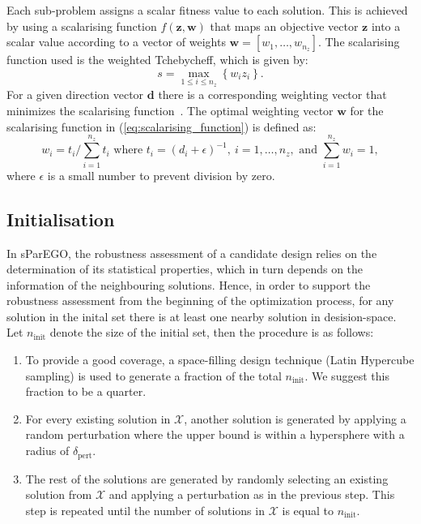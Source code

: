 \documentclass{llncs}
\newcommand{\vz}{\mathbf{z}} %
\newcommand{\vw}{\mathbf{w}} %
\newcommand{\vd}{\mathbf{d}} %
\newcommand{\XSet}{\mathcal{X}} %
\begin{document}
Each sub-problem assigns a scalar fitness value to each solution. This is achieved by using a scalarising function $f(\vz,\vw)$ that maps an objective vector $\vz$ into a scalar value according to a vector of weights $\vw=[w_1,\ldots,w_{n_z}]$. The scalarising function used is the weighted Tchebycheff, which is given by:
\begin{equation}
 s = \max\limits_{1\leq i \leq n_z} \left\{ w_i z_i \right\}.
 \label{eq:scalarising_function}
\end{equation}
For a given direction vector $\vd$ there is a corresponding weighting vector that minimizes the scalarising function~\cite{bib:generational_distance}. The optimal weighting vector $\vw$ for the scalarising function in (\ref{eq:scalarising_function}) is defined as:
\begin{equation}
w_i=t_i \Big/ \sum_{i=1}^{n_z} t_i \text{ where } t_i = (d_i+\epsilon)^{-1}, ~i=1,\ldots,n_z, \text{ and } \sum_{i=1}^{n_z} w_i=1,
\end{equation}
where $\epsilon$ is a small number to prevent division by zero.

\subsection{Initialisation}\label{subsec:initialisation}

In sParEGO, the robustness assessment of a candidate design relies on the determination of its statistical properties, which in turn depends on the information of the neighbouring solutions. Hence, in order to support the robustness assessment from the beginning of the optimization process, for any solution in the inital set there is at least one nearby solution in desision-space. Let $n_{\text{init}}$ denote the size of the initial set, then the procedure is as follows:
\begin{enumerate}
 \item To provide a good coverage, a space-filling design technique (Latin Hypercube sampling) is used to generate a fraction of the total $n_{\text{init}}$. We suggest this fraction to be a quarter.
 
 \item For every existing solution in $\XSet$, another solution is generated by applying a random perturbation where the upper bound is within a hypersphere with a radius of $\delta_\text{pert}$.
 
 \item The rest of the solutions are generated by randomly selecting an existing solution from $\XSet$ and applying a perturbation as in the previous step. This step is repeated until the number of solutions in $\XSet$ is equal to $n_{\text{init}}$.
\end{enumerate}
\end{document}
